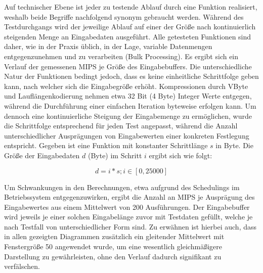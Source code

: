 Auf technischer Ebene ist jeder zu testende Ablauf durch eine Funktion realisiert, weshalb beide Begriffe nachfolgend synonym gebraucht werden. Während des Testdurchgangs wird der jeweilige Ablauf auf einer der Größe nach kontinuierlich steigenden Menge an Eingabedaten ausgeführt. Alle getesteten Funktionen sind daher, wie in der Praxis üblich, in der Lage, variable Datenmengen entgegenzunehmen und zu verarbeiten (Bulk Processing). Es ergibt sich ein Verlauf der gemessenen \ac{MIPS} je Größe des Eingabebuffers. Die unterschiedliche Natur der Funktionen bedingt jedoch, dass es keine einheitliche Schrittfolge geben kann, nach welcher sich die Eingabegröße erhöht. Kompressionen durch VByte und Lauflängenkodierung nehmen etwa 32 Bit (4 Byte) Integer Werte entgegen, während die Durchführung einer einfachen Iteration byteweise erfolgen kann. Um dennoch eine kontinuierliche Steigung der Eingabemenge zu ermöglichen, wurde die Schrittfolge entsprechend für jeden Test angepasst, während die Anzahl unterschiedlicher Ausprägungen von Eingabewerten einer konkreten Festlegung entspricht. Gegeben ist eine Funktion mit konstanter Schrittlänge $s$ in Byte. Die Größe der Eingabedaten $d$ (Byte) im Schritt $i$ ergibt sich wie folgt: 

\begin{equation*}
	d = i * s; i \in [0, 25000]
\end{equation*}

Um Schwankungen in den Berechnungen, etwa aufgrund des Schedulings im Betriebssystem entgegenzuwirken, ergibt die Anzahl an MIPS je Ausprägung des Eingabewertes aus einem Mittelwert von 200 Ausführungen. Der Eingabebuffer wird jeweils je einer solchen Eingabelänge zuvor mit Testdaten gefüllt, welche je nach Testfall von unterschiedlicher Form sind. Zu erwähnen ist hierbei auch, dass in allen gezeigten Diagrammen zusätzlich ein gleitender Mittelwert mit Fenstergröße 50 angewendet wurde, um eine wesentlich gleichmäßigere Darstellung zu gewährleisten, ohne den Verlauf dadurch signifikant zu verfälschen.


